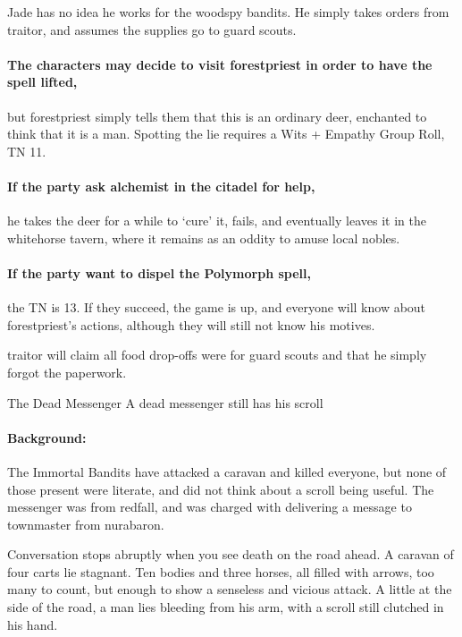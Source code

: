 \begin{multicols}{2}
Jade has no idea he works for the woodspy bandits.
He simply takes orders from \gls{traitor}, and assumes the supplies go to \gls{guard} scouts.

\paragraph{The characters may decide to visit \gls{forestpriest} in order to have the spell lifted,}
but \gls{forestpriest} simply tells them that this is an ordinary deer, enchanted to think that it is a man.
Spotting the lie requires a Wits + Empathy Group Roll, TN 11.

\label{deerDropOff}
\paragraph{If the party ask \gls{alchemist} in the citadel for help,}
he takes the deer for a while to `cure' it, fails, and eventually leaves it in the \gls{whitehorse} tavern, where it remains as an oddity to amuse local nobles.

\paragraph{If the party want to dispel the Polymorph spell,}
the TN is 13.
If they succeed, the game is up, and everyone will know about \gls{forestpriest}'s actions, although they will still not know his motives.

\Gls{traitor} will claim all food drop-offs were for \gls{guard} scouts and that he simply forgot the paperwork.

{The Dead Messenger}%
{A dead messenger still has his scroll}%

\paragraph{Background:}
The Immortal Bandits have attacked a caravan and killed everyone, but none of those present were literate, and did not think about a scroll being useful.
The messenger was from \gls{redfall}, and was charged with delivering a message to \gls{townmaster} from \gls{nurabaron}.

\begin{boxtext}

  Conversation stops abruptly when you see death on the road ahead.
  A caravan of four carts lie stagnant.
  Ten bodies and three horses, all filled with arrows, too many to count, but enough to show a senseless and vicious attack.
  A little at the side of the road, a man lies bleeding from his arm, with a scroll still clutched in his hand.


\end{boxtext}
\end{multicols}
